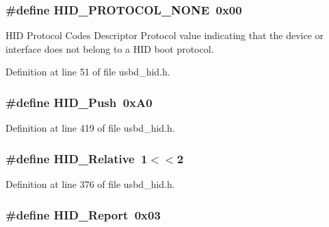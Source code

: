 \subsubsection[{\texorpdfstring{H\+I\+D\+\_\+\+P\+R\+O\+T\+O\+C\+O\+L\+\_\+\+N\+O\+NE}{HID_PROTOCOL_NONE}}]{\setlength{\rightskip}{0pt plus 5cm}\#define H\+I\+D\+\_\+\+P\+R\+O\+T\+O\+C\+O\+L\+\_\+\+N\+O\+NE~0x00}\hypertarget{group__USBD__HID_ga050926404254a7fa1d6b5253a79abc59}{}\label{group__USBD__HID_ga050926404254a7fa1d6b5253a79abc59}
H\+ID Protocol Codes Descriptor Protocol value indicating that the device or interface does not belong to a H\+ID boot protocol. 

Definition at line 51 of file usbd\+\_\+hid.\+h.

\subsubsection[{\texorpdfstring{H\+I\+D\+\_\+\+Push}{HID_Push}}]{\setlength{\rightskip}{0pt plus 5cm}\#define H\+I\+D\+\_\+\+Push~0x\+A0}\hypertarget{group__USBD__HID_ga4426093eb43ab09033d2399464b8e8da}{}\label{group__USBD__HID_ga4426093eb43ab09033d2399464b8e8da}


Definition at line 419 of file usbd\+\_\+hid.\+h.

\subsubsection[{\texorpdfstring{H\+I\+D\+\_\+\+Relative}{HID_Relative}}]{\setlength{\rightskip}{0pt plus 5cm}\#define H\+I\+D\+\_\+\+Relative~1$<$$<$2}\hypertarget{group__USBD__HID_ga606c56b5542c71ccfa76ad2d955c353e}{}\label{group__USBD__HID_ga606c56b5542c71ccfa76ad2d955c353e}


Definition at line 376 of file usbd\+\_\+hid.\+h.

\subsubsection[{\texorpdfstring{H\+I\+D\+\_\+\+Report}{HID_Report}}]{\setlength{\rightskip}{0pt plus 5cm}\#define H\+I\+D\+\_\+\+Report~0x03}\hypertarget{group__USBD__HID_ga00277f2ebb6c21634b4efb4ac484cc08}{}\label{group__USBD__HID_ga00277f2ebb6c21634b4efb4ac484cc08}


